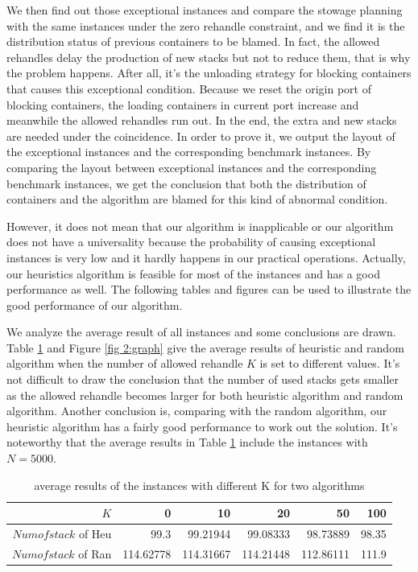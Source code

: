 \documentclass[review,3p,times,authoryear,12pt]{elsarticle}
\begin{document}
We then find out those exceptional instances and compare the stowage planning with the same instances under the zero rehandle constraint, and we find it is the distribution status of previous containers to be blamed.
In fact, the allowed rehandles delay the production of new stacks but not to reduce them, that is why the problem happens.
After all, it's the unloading strategy for blocking containers that causes this exceptional condition.
Because we reset the origin port of blocking containers, the loading containers in current port increase and meanwhile the allowed rehandles run out.
In the end, the extra and new stacks are needed under the coincidence.
In order to prove it, we output the layout of the exceptional instances and the corresponding benchmark instances.
By comparing the layout between exceptional instances and the corresponding benchmark instances, we get the conclusion that both the distribution of containers and the algorithm are blamed for this kind of abnormal condition.

However, it does not mean that our algorithm is inapplicable or our algorithm does not have a universality because the probability of causing exceptional instances is very low and it hardly happens in our practical operations.
Actually, our heuristics algorithm is feasible for most of the instances and has a good performance as well.
The following tables and figures can be used to illustrate the good performance of our algorithm.

We analyze the average result of all instances and some conclusions are drawn.
Table \ref{tab:4} and Figure \ref{fig 2:graph} give the average results of heuristic and random algorithm when the number of allowed rehandle $K$ is set to different values.
It's not difficult to draw the conclusion that the number of used stacks gets smaller as the allowed rehandle becomes larger for both heuristic algorithm and random algorithm.
Another conclusion is, comparing with the random algorithm, our heuristic algorithm has a fairly good performance to work out the solution.
It's noteworthy that the average results in Table \ref{tab:4} include the instances with $N=5000$.

\begin{table}[htbp]
  \centering
  \setlength{\belowcaptionskip}{10pt}
  \caption{average results of the instances with different K for two algorithms}
    \begin{tabular}{r|r|r|r|r|r}
    \hline
     $K$       &0   &10  &20  &50  &100\\
    \hline
    $Numofstack$ of Heu   &99.3  &99.21944  &99.08333   &98.73889  &98.35\\
 \hline
    $Numofstack$ of Ran  &114.62778  &114.31667  &114.21448  &112.86111 &111.9\\
 \hline
    \end{tabular}
  \label{tab:4}
\end{table}
\end{document}
